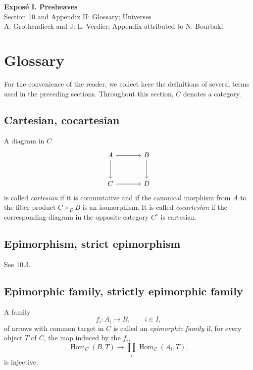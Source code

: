 \documentclass[11pt]{article}
\newcommand{\Hom}{\operatorname{Hom}}
\begin{document}
\begin{center}
{\Large \textbf{Expos\'e I. Presheaves}}\\[0.35em]
{\large Section 10 and Appendix II: Glossary; Universes}\\[0.35em]
A. Grothendieck and J.-L. Verdier; Appendix attributed to N. Bourbaki
\end{center}

\bigskip


\setcounter{section}{9}
\section{Glossary}

For the convenience of the reader, we collect here the definitions of several terms used in the preceding sections. Throughout this section, \(C\) denotes a category.

\subsection{Cartesian, cocartesian}

A diagram in \(C\)
\[
\begin{tikzcd}[column sep=large,row sep=large]
A \arrow[r] \arrow[d] & B \arrow[d] \\
C \arrow[r] & D
\end{tikzcd}
\]
is called \emph{cartesian} if it is commutative and if the canonical morphism from \(A\) to the fiber product \(C\times_D B\) is an isomorphism. It is called \emph{cocartesian} if the corresponding diagram in the opposite category \(C^\circ\) is cartesian.

\subsection{Epimorphism, strict epimorphism}

See 10.3.

\subsection{Epimorphic family, strictly epimorphic family}

A family
\[
 f_i:A_i\longrightarrow B,\qquad i\in I,
\]
of arrows with common target in \(C\) is called an \emph{epimorphic family} if, for every object \(T\) of \(C\), the map induced by the \(f_i\),
\begin{equation}
 \Hom_C(B,T)\longrightarrow \prod_i \Hom_C(A_i,T),
 \tag{10.3.1}
\end{equation}
is injective.
\end{document}
